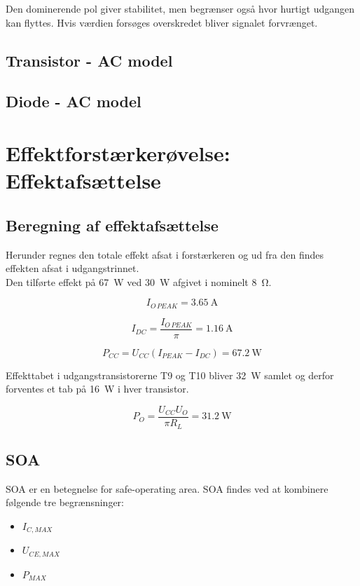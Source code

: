 \documentclass[danish]{article}
\begin{document}
Den dominerende pol giver stabilitet, men begrænser også hvor hurtigt udgangen kan flyttes. Hvis værdien forsøges overskredet bliver signalet forvrænget.

\subsection{Transistor - AC model}
\subsection{Diode - AC model}

\newpage
\section{Effektforstærkerøvelse: Effektafsættelse}
\subsection{Beregning af effektafsættelse}
Herunder regnes den totale effekt afsat i forstærkeren og ud fra den findes effekten afsat i udgangstrinnet.\\

Den tilførte effekt på \SI{67}{\watt} ved \SI{30}{\watt} afgivet i nominelt \SI{8}{\ohm}. 

\begin{equation}
I_{O\,PEAK} = \SI{3.65}{\ampere}
\end{equation}

\begin{equation}
I_{DC} = \dfrac{I_{O\,PEAK}}{\pi} =\SI{1.16}{\ampere}
\end{equation}

\begin{equation}
P_{CC} = U_{CC}(I_{PEAK}-I_{DC})=\SI{67.2}{\watt}
\end{equation}

Effekttabet i udgangstransistorerne T9 og T10 bliver \SI{32}{\watt} samlet og derfor forventes et tab på \SI{16}{\watt} i hver transistor. 

\begin{equation}
P_O = \dfrac{U_{CC}U_O}{\pi R_L} =\SI{31.2}{\watt}
\end{equation}

\subsection{SOA}
SOA er en betegnelse for safe-operating area.
SOA findes ved at kombinere følgende tre begrænsninger:
\begin{itemize}
	\item $I_{C,MAX}$
	\item  $U_{CE,MAX}$
	\item  $P_{MAX}$
\end{itemize}
\end{document}

